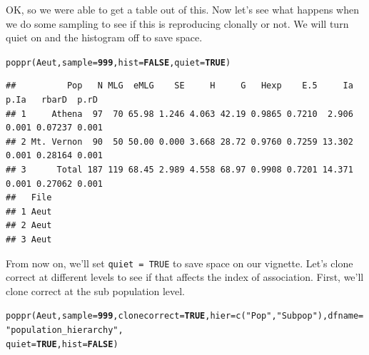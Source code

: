 \documentclass[letterpaper]{article}\usepackage[]{graphicx}\usepackage[]{color}
\makeatletter
\newcommand{\hlnum}[1]{\textcolor[rgb]{0.502,0,0.502}{\textbf{#1}}}%
\newcommand{\hlstr}[1]{\textcolor[rgb]{0.651,0.522,0}{#1}}%
\newcommand{\hlstd}[1]{\textcolor[rgb]{0,0,0}{#1}}%
\newcommand{\hlkwc}[1]{\textcolor[rgb]{0,0.502,0.753}{#1}}%
\newcommand{\hlkwd}[1]{\textcolor[rgb]{0,0.267,0.4}{#1}}%
\newenvironment{kframe}{%
 \def\at@end@of@kframe{}%
 \ifinner\ifhmode%
  \def\at@end@of@kframe{\end{minipage}}%
  \begin{minipage}{\columnwidth}%
 \fi\fi%
 \def\FrameCommand##1{\hskip\@totalleftmargin \hskip-\fboxsep
 \colorbox{shadecolor}{##1}\hskip-\fboxsep
     \hskip-\linewidth \hskip-\@totalleftmargin \hskip\columnwidth}%
 \MakeFramed {\advance\hsize-\width
   \@totalleftmargin\z@ \linewidth\hsize
   \@setminipage}}%
 {\par\unskip\endMakeFramed%
 \at@end@of@kframe}
\newenvironment{knitrout}{}{} %
\makeatother
\begin{document}
OK, so we were able to get a table out of this. Now let's see what happens when we do some sampling to see if this is reproducing clonally or not. We will turn quiet on and the histogram off to save space.
\begin{knitrout}\footnotesize
{}\color{fgcolor}\begin{kframe}
\begin{alltt}
\hlkwd{poppr}\hlstd{(Aeut,} \hlkwc{sample} \hlstd{=} \hlnum{999}\hlstd{,} \hlkwc{hist} \hlstd{=} \hlnum{FALSE}\hlstd{,} \hlkwc{quiet} \hlstd{=} \hlnum{TRUE}\hlstd{)}
\end{alltt}
\end{kframe}
\end{knitrout}

\begin{knitrout}\footnotesize
{}\color{fgcolor}\begin{kframe}
\begin{verbatim}
##          Pop   N MLG  eMLG    SE     H     G   Hexp    E.5     Ia  p.Ia   rbarD  p.rD
## 1     Athena  97  70 65.98 1.246 4.063 42.19 0.9865 0.7210  2.906 0.001 0.07237 0.001
## 2 Mt. Vernon  90  50 50.00 0.000 3.668 28.72 0.9760 0.7259 13.302 0.001 0.28164 0.001
## 3      Total 187 119 68.45 2.989 4.558 68.97 0.9908 0.7201 14.371 0.001 0.27062 0.001
##   File
## 1 Aeut
## 2 Aeut
## 3 Aeut
\end{verbatim}
\end{kframe}
\end{knitrout}

From now on, we'll set \texttt{quiet = TRUE} to save space on our vignette. Let's clone correct at different levels to see if that affects the index of association. First, we'll clone correct at the sub population level.
\begin{knitrout}\footnotesize
{}\color{fgcolor}\begin{kframe}
\begin{alltt}
\hlkwd{poppr}\hlstd{(Aeut,} \hlkwc{sample} \hlstd{=} \hlnum{999}\hlstd{,} \hlkwc{clonecorrect} \hlstd{=} \hlnum{TRUE}\hlstd{,} \hlkwc{hier} \hlstd{=} \hlkwd{c}\hlstd{(}\hlstr{"Pop"}\hlstd{,} \hlstr{"Subpop"}\hlstd{),} \hlkwc{dfname} \hlstd{=} \hlstr{"population_hierarchy"}\hlstd{,}
    \hlkwc{quiet} \hlstd{=} \hlnum{TRUE}\hlstd{,} \hlkwc{hist} \hlstd{=} \hlnum{FALSE}\hlstd{)}
\end{alltt}
\end{kframe}
\end{knitrout}
\end{document}
